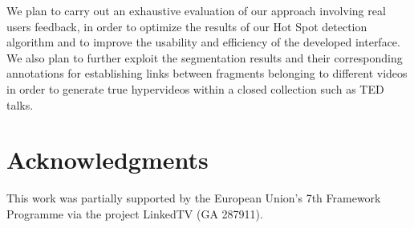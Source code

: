 \documentclass{llncs}
\begin{document}
We plan to carry out an exhaustive evaluation of our approach involving real users feedback, in order to optimize the results of our Hot Spot detection algorithm and to improve the usability and efficiency of the developed interface. We also plan to further exploit the segmentation results and their corresponding annotations for establishing links between fragments belonging to different videos in order to generate true hypervideos within a closed collection such as TED talks.


\section*{Acknowledgments}
This work was partially supported by the European Union's 7th Framework Programme via the project LinkedTV (GA 287911).



\end{document}
